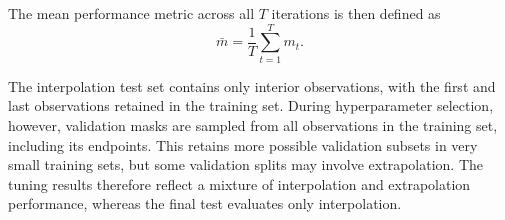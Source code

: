 The mean performance metric across all \(T\) iterations is then defined as
\[
	\bar{m} = \frac{1}{T} \sum_{t=1}^{T} m_t.
\]

The interpolation test set contains only interior observations, with the first and last observations retained in the training set.
During hyperparameter selection, however, validation masks are sampled from all observations in the training set, including its endpoints.
This retains more possible validation subsets in very small training sets, but some validation splits may involve extrapolation.
The tuning results therefore reflect a mixture of interpolation and extrapolation performance, whereas the final test evaluates only interpolation.
